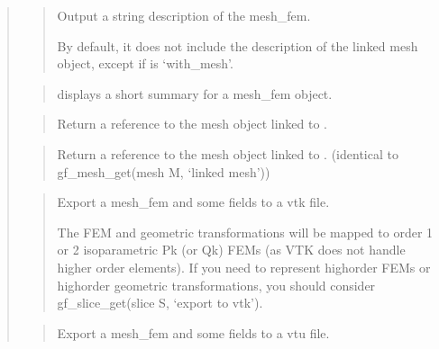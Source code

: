 \documentclass[a4paper,11pt,english]{sphinxmanual}
\begin{document}
\begin{quote}
\begin{quote}
Output a string description of the mesh\_fem.

By default, it does not include the description of the linked mesh
object, except if  is ‘with\_mesh’.
\end{quote}

\begin{quote}

displays a short summary for a mesh\_fem object.
\end{quote}

\begin{quote}

Return a reference to the mesh object linked to .
\end{quote}

\begin{quote}

Return a reference to the mesh object linked to .
(identical to gf\_mesh\_get(mesh M, ‘linked mesh’))
\end{quote}

\begin{quote}

Export a mesh\_fem and some fields to a vtk file.

The FEM and geometric transformations will be mapped to order 1
or 2 isoparametric Pk (or Qk) FEMs (as VTK does not handle higher
order elements). If you need to represent high\sphinxhyphen{}order FEMs or
high\sphinxhyphen{}order geometric transformations, you should consider
gf\_slice\_get(slice S, ‘export to vtk’).
\end{quote}

\begin{quote}

Export a mesh\_fem and some fields to a vtu file.


\end{quote}
\end{quote}
\end{document}
